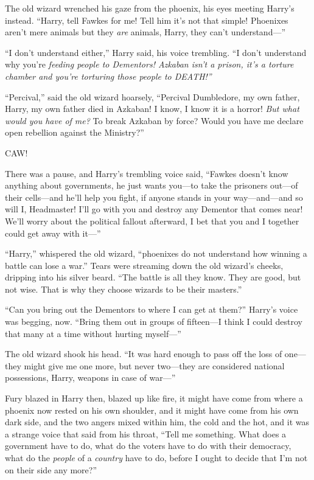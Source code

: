 The old wizard wrenched his gaze from the phoenix, his eyes meeting
Harry's instead. ``Harry, tell Fawkes for me! Tell him it's not that
simple! Phoenixes aren't mere animals but they \emph{are} animals,
Harry, they can't understand---''

``I don't understand either,'' Harry said, his voice trembling. ``I
don't understand why you're \emph{feeding people to Dementors! Azkaban
isn't a prison, it's a torture chamber and you're torturing those people
to DEATH!''}

``Percival,'' said the old wizard hoarsely, ``Percival Dumbledore, my
own father, Harry, my own father died in Azkaban! I know, I know it is a
horror! \emph{But what would you have of me?} To break Azkaban by force?
Would you have me declare open rebellion against the Ministry?''

CAW!

There was a pause, and Harry's trembling voice said, ``Fawkes doesn't
know anything about governments, he just wants you---to take the
prisoners out---of their cells---and he'll help you fight, if anyone
stands in your way---and---and so will I, Headmaster! I'll go with you
and destroy any Dementor that comes near! We'll worry about the
political fallout afterward, I bet that you and I together could get
away with it---''

``Harry,'' whispered the old wizard, ``phoenixes do not understand how
winning a battle can lose a war.'' Tears were streaming down the old
wizard's cheeks, dripping into his silver beard. ``The battle is all
they know. They are good, but not wise. That is why they choose wizards
to be their masters.''

``Can you bring out the Dementors to where I can get at them?'' Harry's
voice was begging, now. ``Bring them out in groups of fifteen---I think
I could destroy that many at a time without hurting myself---''

The old wizard shook his head. ``It was hard enough to pass off the loss
of one---they might give me one more, but never two---they are
considered national possessions, Harry, weapons in case of war---''

Fury blazed in Harry then, blazed up like fire, it might have come from
where a phoenix now rested on his own shoulder, and it might have come
from his own dark side, and the two angers mixed within him, the cold
and the hot, and it was a strange voice that said from his throat,
``Tell me something. What does a government have to do, what do the
voters have to do with their democracy, what do the \emph{people} of a
\emph{country} have to do, before I ought to decide that I'm not on
their side any more?''

